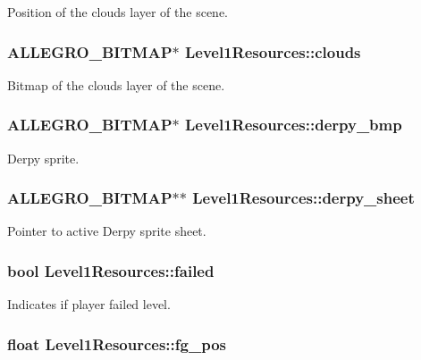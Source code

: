 Position of the clouds layer of the scene. \hypertarget{structLevel1Resources_a600f35107c2716e7814ad9106821b75f}{
\subsubsection[{clouds}]{\setlength{\rightskip}{0pt plus 5cm}A\+L\+L\+E\+G\+R\+O\+\_\+\+B\+I\+T\+M\+A\+P$\ast$ Level1\+Resources\+::clouds}}\label{structLevel1Resources_a600f35107c2716e7814ad9106821b75f}
Bitmap of the clouds layer of the scene. \hypertarget{structLevel1Resources_af763820606e5299a46a2b7bc426ab917}{
\subsubsection[{derpy\+\_\+bmp}]{\setlength{\rightskip}{0pt plus 5cm}A\+L\+L\+E\+G\+R\+O\+\_\+\+B\+I\+T\+M\+A\+P$\ast$ Level1\+Resources\+::derpy\+\_\+bmp}}\label{structLevel1Resources_af763820606e5299a46a2b7bc426ab917}
Derpy sprite. \hypertarget{structLevel1Resources_a378dea75ef4682624c7aac6845f113f2}{
\subsubsection[{derpy\+\_\+sheet}]{\setlength{\rightskip}{0pt plus 5cm}A\+L\+L\+E\+G\+R\+O\+\_\+\+B\+I\+T\+M\+A\+P$\ast$$\ast$ Level1\+Resources\+::derpy\+\_\+sheet}}\label{structLevel1Resources_a378dea75ef4682624c7aac6845f113f2}
Pointer to active Derpy sprite sheet. \hypertarget{structLevel1Resources_a78f735228eaebbd7cbb90ebc554c88d7}{
\subsubsection[{failed}]{\setlength{\rightskip}{0pt plus 5cm}bool Level1\+Resources\+::failed}}\label{structLevel1Resources_a78f735228eaebbd7cbb90ebc554c88d7}
Indicates if player failed level. \hypertarget{structLevel1Resources_a892da6cd93c497a130e50d40c3e3ed5d}{
\subsubsection[{fg\+\_\+pos}]{\setlength{\rightskip}{0pt plus 5cm}float Level1\+Resources\+::fg\+\_\+pos}}\label{structLevel1Resources_a892da6cd93c497a130e50d40c3e3ed5d}
